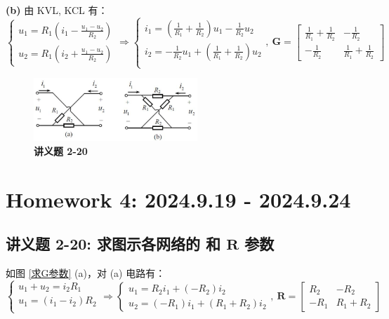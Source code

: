 \documentclass[UTF8]{report}
\theoremstyle{MyLineTheoremStyle} %
\theoremstyle{MyBlockTheoremStyle} %
\theoremstyle{MySubsubsectionStyle} %
\begin{document}
\textbf{(b)} 由 KVL, KCL 有：
\begin{equation}
\begin{cases}
    u_1 = R_1\left( i_1 - \frac{u_1 - u_2}{R_2} \right)\\
    u_2 = R_1 \left( i_2 + \frac{u_1 - u_2}{R_2} \right)
\end{cases}\Longrightarrow  
\begin{cases}
    i_1 = \left( \frac{1}{R_1} + \frac{1}{R_2} \right)u_1 - \frac{1}{R_2}u_2 \\ 
    i_2 =  - \frac{1}{R_2}u_1  + \left( \frac{1}{R_1} + \frac{1}{R_2} \right)u_2\\ 
\end{cases},\ 
\boldsymbol{G} = 
\begin{bmatrix}
    \frac{1}{R_1} + \frac{1}{R_2} & -\frac{1}{R_2} \\ 
    -\frac{1}{R_2} & \frac{1}{R_1} + \frac{1}{R_2}
\end{bmatrix}
\end{equation}

\begin{figure}[H]\centering
\includegraphics[width=0.55\textwidth]{assets/3/image (8).jpg}
\caption{\bfseries 讲义题 2-20}\label{讲义题 2-20}
\end{figure}


\chapter{Homework 4: 2024.9.19 - 2024.9.24}\thispagestyle{fancy}

\section{讲义题 2-20: 求图示各网络的 和 $\boldsymbol{R}$ 参数}


如图 \ref{求G参数} (a)，对 (a) 电路有：
\begin{equation}
\begin{cases}
    u_1 + u_2 = i_2R_1 \\ 
    u_1 = (i_1 - i_2)R_2 \\ 
\end{cases}
\Longrightarrow 
\begin{cases}
    u_1 = R_2 i_1 + (-R_2)i_2 \\ 
    u_2 = (-R_1)i_1 + (R_1+R_2)i_2
\end{cases},\ 
\boldsymbol{R} = 
\begin{bmatrix}
    R_2 & -R_2 \\ 
    -R_1 & R_1+R_2
\end{bmatrix}
\end{equation}
\end{document}
